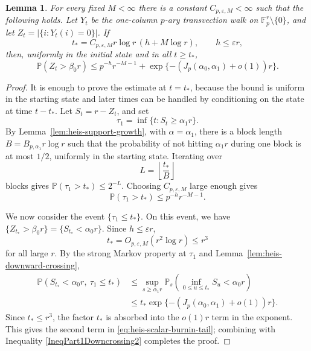 \documentclass[11pt, reqno]{amsart}
\numberwithin{equation}{section}
\newtheorem{lemma}[theorem]{Lemma}
\newcommand{\Fp}{\mathbb F_p}
\newcommand{\Prob}{\mathbb P}
\begin{document}
\begin{lemma}\label{lem:heis-scalar-burnin}
For every fixed \(M<\infty\) there is a constant
\(C_{p,\varepsilon,M}<\infty\) such that the following holds.  Let \(Y_t\) be
the one-column \(p\)-ary transvection walk on \(\Fp^r\setminus\{0\}\), and let
\(Z_t=|\{i:Y_t(i)=0\}|\).  If
\[
    t_*=C_{p,\varepsilon,M}r\log r\,(h+M\log r),
    \qquad h\le\varepsilon r,
\]
then, uniformly in the initial state and in all \(t\ge t_*\),
\begin{equation}\label{eq:heis-scalar-burnin-tail}
    \Prob(Z_t>\beta_0 r)
    \le p^{-h}r^{-M-1}+\exp\{-(J_p(\alpha_0,\alpha_1)+o(1))r\}.
\end{equation}
\end{lemma}

\begin{proof}
It is enough to prove the estimate at \(t=t_*\), because the bound is uniform
in the starting state and later times can be handled by conditioning on the
state at time \(t-t_*\).  Let \(S_t=r-Z_t\), and set
\[
    \tau_1=\inf\{t:S_t\ge\alpha_1r\}.
\]
By Lemma~\ref{lem:heis-support-growth}, with \(\alpha=\alpha_1\), there is a
block length \(B=B_{p,\alpha_1}r\log r\) such that the probability of not
hitting \(\alpha_1r\) during one block is at most \(1/2\), uniformly in the
starting state.  Iterating over
\[
    L=\left\lfloor\frac{t_*}{B}\right\rfloor
\]
blocks gives \(\Prob(\tau_1>t_*)\le2^{-L}\).  Choosing
\(C_{p,\varepsilon,M}\) large enough gives 
\begin{equation} \label{IneqPart1Downcrossing2}
\Prob(\tau_1>t_*) \le p^{-h}r^{-M-1}.
\end{equation}


We now consider the event \(\{\tau_1\le t_*\}\). On this event, we have \(\{Z_{t_*}>\beta_0r\} = \{S_{t_*}<\alpha_0r\}\).  Since \(h\le\varepsilon r\),
\[
    t_*=O_{p,\varepsilon,M}(r^2\log r)\le r^3
\]
for all large \(r\).  By the strong Markov property at \(\tau_1\) and
Lemma~\ref{lem:heis-downward-crossing},
\[
\begin{aligned}
    \Prob(S_{t_*}<\alpha_0r,\ \tau_1\le t_*)
    &\le
    \sup_{s\ge\alpha_1r}
    \Prob_s\left(\inf_{0\le u\le t_*}S_u<\alpha_0r\right) \\
    &\le
    t_*\exp\{-(J_p(\alpha_0,\alpha_1)+o(1))r\}.
\end{aligned}
\]
Since \(t_*\le r^3\), the factor \(t_*\) is absorbed into the \(o(1)r\) term
in the exponent.  This gives the second term in \eqref{eq:heis-scalar-burnin-tail}; combining with Inequality \eqref{IneqPart1Downcrossing2} completes the proof.
\end{proof}
\end{document}
